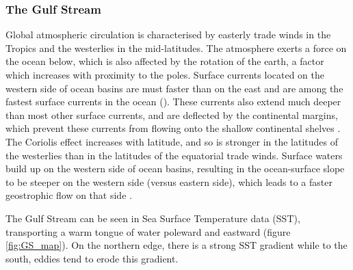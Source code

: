 \subsubsection {The Gulf Stream}

Global atmospheric circulation is characterised by easterly trade winds in the Tropics and the westerlies in the mid-latitudes.  The atmosphere exerts a force on the ocean below, which is also affected by the rotation of the earth, a factor which increases with proximity to the poles. Surface currents located on the western side of ocean basins are must faster than on the east and are among the fastest surface currents in the ocean (\citep{nasa_ocean}).  These currents also extend much deeper than most other surface currents, and are deflected by the continental margins, which prevent these currents from flowing onto the shallow continental shelves \citep{nasa_wbc}.
The Coriolis effect increases with latitude, and so is stronger in the latitudes of the westerlies than in the latitudes of the equatorial trade winds. Surface waters build up on the western side of ocean basins, resulting in the ocean-surface slope to be steeper on the western side (versus eastern side), which leads to a faster geostrophic flow on that side \citep{nasa_wbc}.

The Gulf Stream can be seen in Sea Surface Temperature data (SST), transporting a warm tongue of water poleward and eastward (figure \ref{fig:GS_map}). On the northern edge, there is a strong SST gradient while to the south, eddies tend to erode this gradient.

